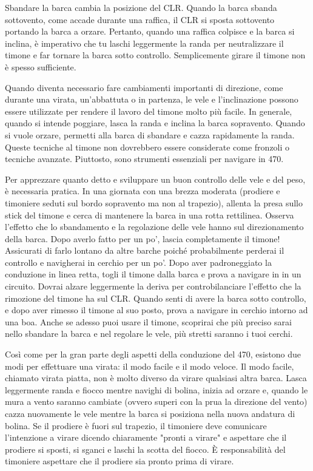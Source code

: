 Sbandare la barca cambia la posizione del CLR. Quando la barca sbanda
sottovento, come accade durante una raffica, il CLR si sposta sottovento
portando la barca a orzare. Pertanto, quando una raffica colpisce e la barca
si inclina, è imperativo che tu laschi leggermente la randa per neutralizzare il
timone e far tornare la barca sotto controllo. Semplicemente girare il timone
non è spesso sufficiente.

Quando diventa necessario fare cambiamenti importanti di
direzione, come durante una virata, un'abbattuta o in partenza,
le vele e l'inclinazione possono essere utilizzate per rendere il lavoro del
timone molto più facile. In generale, quando si intende poggiare, lasca la
randa e inclina la barca sopravento. Quando si vuole orzare, permetti
alla barca di sbandare e cazza rapidamente la randa. Queste tecniche al timone
non dovrebbero essere considerate come fronzoli o tecniche avanzate. Piuttosto,
sono strumenti essenziali per navigare in 470.

Per apprezzare quanto detto e sviluppare un buon controllo delle vele e del peso, è
necessaria pratica. In una giornata con una brezza moderata (prodiere e
timoniere seduti sul bordo sopravento ma non al trapezio), allenta la presa
sullo stick del timone e cerca di mantenere la barca in una rotta rettilinea.
Osserva l'effetto che lo sbandamento e la regolazione delle vele hanno sul
direzionamento della barca. Dopo averlo
fatto per un po', lascia completamente il timone! Assicurati di farlo lontano da
altre barche poiché probabilmente perderai il controllo e navigherai in cerchio
per un po'. Dopo aver padroneggiato la conduzione in linea retta, togli il timone dalla barca
e prova a navigare in in un circuito. Dovrai alzare leggermente la deriva per
controbilanciare l'effetto che la rimozione del timone ha sul CLR. Quando senti
di avere la barca sotto controllo, e dopo aver rimesso il timone al suo posto,
prova a navigare in cerchio intorno ad una boa. Anche se adesso puoi usare il
timone, scoprirai che più preciso sarai nello sbandare la barca e
nel regolare le vele, più stretti saranno i tuoi cerchi.

Così come per la gran parte degli aspetti della conduzione del 470, esistono due
modi per effettuare una virata: il modo facile e il modo veloce. Il modo facile,
chiamato virata piatta, non è molto diverso da virare qualsiasi altra barca.
Lasca leggermente randa e fiocco mentre navighi di bolina, inizia ad orzare e,
quando le mura a vento saranno cambiate (ovvero superi con la prua la direzione
del vento) cazza nuovamente le vele mentre la barca si posiziona nella nuova
andatura di bolina.
Se il prodiere è fuori sul trapezio, il timoniere deve comunicare l'intenzione a
virare dicendo chiaramente  "pronti a virare" e aspettare che il prodiere si
sposti, si sganci e laschi la scotta del fiocco. È responsabilità del timoniere
aspettare che il prodiere sia pronto prima di virare.

